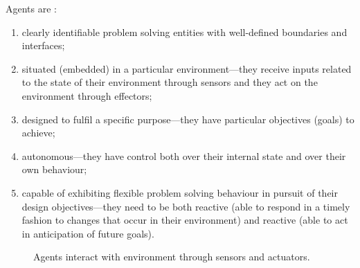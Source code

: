 \documentclass[11pt,oneside,a4paper,openright]{report}
\begin{document}
Agents are \cite[p.115-152]{WooldridgeJennings1995}:
\begin{enumerate}[i-]
 \item clearly identifiable problem solving entities with well-defined boundaries and
interfaces;
\item situated (embedded) in a particular environment—they receive inputs related to the
state of their environment through sensors and they act on the environment through
effectors;
\item designed to fulfil a specific purpose—they have particular objectives (goals) to
achieve;
\item autonomous—they have control both over their internal state and over their own
behaviour;
\item capable of exhibiting flexible problem solving behaviour in pursuit of their design
objectives—they need to be both reactive (able to respond in a timely fashion to
changes that occur in their environment) and reactive (able to act in anticipation of
future goals).
\end{enumerate}


	\begin{figure}[h]
	\centering
	\setlength\fboxsep{0pt}
	\setlength\fboxrule{0.5pt}
	\caption{Agents interact with environment through sensors and actuators.}
	\label{fig:AgWool}
	\end{figure}

\end{document}
